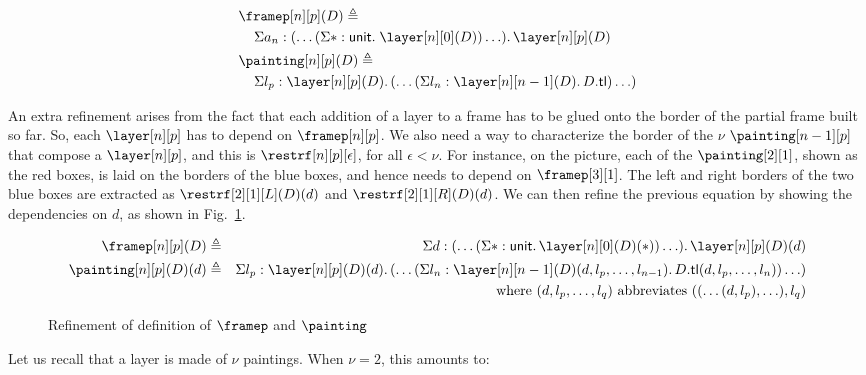 \documentclass[10pt]{art.cls/art}
\newcommand{\unittype}{\ensuremath{\mathsf{unit}}}
\newcommand{\unitpoint}{\ensuremath{\ast}}
\newcommand{\defeq}{\ensuremath{\triangleq}}
\newcommand{\tl}{\ensuremath{\mathsf{tl}}}
\begin{document}
\begin{align*}
   & \framep[n][p](D) \defeq                                                                                     \\
   & \;\;\;\;\Sigma a_n : (\ldots (\Sigma \unitpoint : \unittype .\; \layer[n][0](D)) \ldots) .\,\layer[n][p](D) \\
   & \painting[n][p](D) \defeq                                                                                   \\
   & \;\;\;\;\Sigma l_p : \layer[n][p](D).\, (\ldots (\Sigma l_n : \layer[n][n - 1](D) .\, D.\tl) \ldots)
\end{align*}

An extra refinement arises from the fact that each addition of a layer to a frame has to be glued onto the border of the partial frame built so far. So, each $\layer[n][p]$ has to depend on $\framep[n][p]$. We also need a way to characterize the border of the $\nu$ $\painting[n-1][p]$ that compose a $\layer[n][p]$, and this is $\restrf[n][p][\epsilon]$, for all $\epsilon < \nu$. For instance, on the picture, each of the $\painting[2][1]$, shown as the red boxes, is laid on the borders of the blue boxes, and hence needs to depend on $\framep[3][1]$. The left and right borders of the two blue boxes are extracted as $\restrf[2][1][L](D)(d)$ and $\restrf[2][1][R](D)(d)$. We can then refine the previous equation by showing the dependencies on $d$, as shown in Fig.~\ref{fig:refinement}.

\begin{figure*}[!t]
  \begin{align*}
    \framep[n][p](D)      & \defeq & \Sigma d : (\ldots (\Sigma \unitpoint: \unittype.\, \layer[n][0](D)(\unitpoint)) \ldots).\, \layer[n][p](D)(d)                                \\
    \painting[n][p](D)(d) & \defeq & \Sigma l_p: \layer[n][p](D)(d).\, (\ldots (\Sigma l_n : \layer[n][n - 1](D)(d, l_p, \ldots, l_{n - 1}).\, D.\tl(d, l_p, \ldots, l_n)) \ldots) \\
                          &        & \text{where } (d, l_p, \ldots, l_q) \text{ abbreviates } ((\ldots(d, l_p), \ldots), l_q)
  \end{align*}
  \caption{Refinement of definition of $\framep$ and $\painting$\label{fig:refinement}}
\end{figure*}

Let us recall that a layer is made of $\nu$ paintings. When $\nu = 2$, this amounts to:
\end{document}
